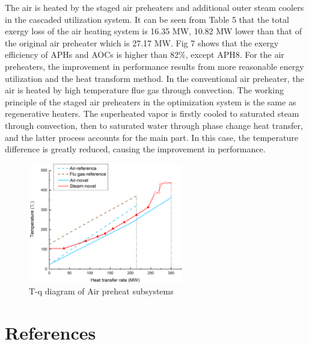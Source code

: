 \documentclass[preprint,12pt]{elsarticle}
\begin{document}
The air is heated by the staged air preheaters and additional outer steam coolers in the cascaded utilization system.
 It can be seen from Table 5 that the total exergy loss of the air heating system is 16.35 MW, 10.82 MW lower than that of the original air preheater which is 27.17 MW. 
 Fig 7 shows that the exergy efficiency of APHs and AOCs is higher than 82\%, except APH8.
 For the air preheaters, the improvement in performance results from more reasonable energy utilization and the heat transform method. 
 In the conventional air preheater, the air is heated by high temperature flue gas through convection. 
 The working principle of the staged air preheaters in the optimization system is the same as regenerative heaters. 
 The superheated vapor is firstly cooled to saturated steam through convection, then to saturated water through phase change heat transfer, and the latter process accounts for the main part. 
 In this case, the temperature difference is greatly reduced, causing the improvement in performance.

\begin{figure}[htbp]
\centering
\includegraphics[width=0.6\textwidth]{fig/APH_temper_compare.png}
\caption{T-q diagram of Air preheat subsystems} 
\label{fig:APH_temper_compare}
\end{figure}


\section*{References}



\end{document}
